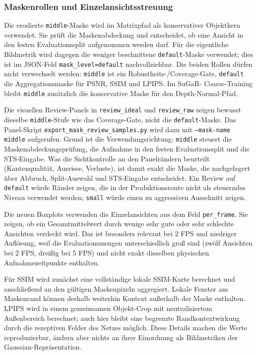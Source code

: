 \documentclass[12pt,a4paper]{article}
\begin{document}
\subsubsection*{Maskenrollen und Einzelansichtsstreuung}
Die erodierte \texttt{middle}-Maske wird im Matrixpfad als konservativer
Objektkern verwendet. Sie prüft die Maskenabdeckung und entscheidet, ob eine
Ansicht in den festen Evaluationssplit aufgenommen werden darf. Für die
eigentliche Bildmetrik wird dagegen die weniger beschnittene
\texttt{default}-Maske verwendet; dies ist im JSON-Feld
\texttt{mask\_level=default} nachvollziehbar. Die beiden Rollen dürfen nicht
verwechselt werden: \texttt{middle} ist ein Robustheits-/Coverage-Gate,
\texttt{default} die Aggregationsmaske für PSNR, SSIM und LPIPS. Im SuGaR-
Coarse-Training bleibt \texttt{middle} zusätzlich die konservative Maske für
den Depth-Normal-Pfad.

Die visuellen Review-Panels in \texttt{review\_ideal} und
\texttt{review\_raw} zeigen bewusst dieselbe \texttt{middle}-Stufe wie das
Coverage-Gate, nicht die \texttt{default}-Maske. Das Panel-Skript
\texttt{export\_mask\_review\_samples.py} wird dazu mit
\texttt{--mask-name middle} aufgerufen. Grund ist die Verwendungsrichtung:
\texttt{middle} steuert die Maskenabdeckungsprüfung, die Aufnahme in den
festen Evaluationssplit und die STS-Eingabe. Was die Sichtkontrolle an den
Panelrändern beurteilt (Kantenqualität, Ausrisse, Verluste), ist damit exakt
die Maske, die nachgelagert über Abbruch, Split-Auswahl und STS-Eingabe
entscheidet. Ein Review auf \texttt{default} würde Ränder zeigen, die in der
Produktionsroute nicht als steuerndes Niveau verwendet werden;
\texttt{small} würde einen zu aggressiven Ausschnitt zeigen.

Die neuen Boxplots verwenden die Einzelansichten aus dem Feld
\texttt{per\_frame}. Sie zeigen, ob ein Gesamtmittelwert durch wenige sehr gute
oder sehr schlechte Ansichten verdeckt wird. Das ist besonders relevant bei
2 FPS und niedriger Auflösung, weil die Evaluationsmengen unterschiedlich groß
sind (zwölf Ansichten bei 2 FPS, dreißig bei 5 FPS) und nicht exakt dieselben
physischen Aufnahmezeitpunkte enthalten.

Für SSIM wird zunächst eine vollständige lokale SSIM-Karte berechnet und
anschließend an den gültigen Maskenpixeln aggregiert. Lokale Fenster am
Maskenrand können deshalb weiterhin Kontext außerhalb der Maske enthalten.
LPIPS wird in einem gemeinsamen Objekt-Crop mit neutralisiertem Außenbereich
berechnet; auch hier bleibt eine begrenzte Randkontextwirkung durch die
rezeptiven Felder des Netzes möglich. Diese Details machen die Werte
reproduzierbar, ändern aber nichts an ihrer Einordnung als Bildmetriken der
Gaussian-Repräsentation.
\end{document}
